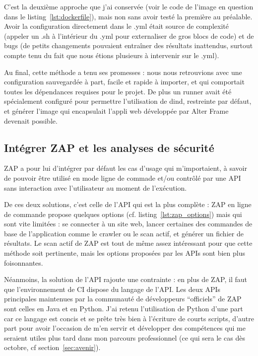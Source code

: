 C'est la deuxième approche que j'ai conservée (voir le code de l'image en question dans le listing~\ref{lst:dockerfile}), mais non sans avoir testé la première au préalable. Avoir la configuration directement dans le .yml était source de complexité (appeler un .sh à l'intérieur du .yml pour externaliser de gros blocs de code) et de bugs (de petits changements pouvaient entraîner des résultats inattendus, surtout compte tenu du fait que nous étions plusieurs à intervenir sur le .yml).

Au final, cette méthode a tenu ses promesses : nous nous retrouvions avec une configuration sauvegardée à part, facile et rapide à importer, et qui comportait toutes les dépendances requises pour le projet. De plus un runner avait été spécialement configuré pour permettre l'utilisation de dind, restreinte par défaut, et générer l'image qui encapsulait l'appli web développée par Alter Frame devenait possible.

\subsection{Intégrer ZAP et les analyses de sécurité}
ZAP a pour lui d'intégrer par défaut les cas d'usage qui m'importaient, à savoir de pouvoir être utilisé en mode ligne de commade et/ou contrôlé par une API sans interaction avec l'utilisateur au moment de l'exécution.

De ces deux solutions, c'est celle de l'API qui est la plus complète : ZAP en ligne de commande propose quelques options (cf. listing~\ref{lst:zap_options}) mais qui sont vite limitées : se connecter à un site web, lancer certaines des commandes de base de l'application comme le crawler ou le scan actif, et générer un fichier de résultats. Le scan actif de ZAP est tout de même assez intéressant pour que cette méthode soit pertinente, mais les options proposées par les APIs sont bien plus foisonnantes.

Néanmoins, la solution de l'API rajoute une contrainte : en plus de ZAP, il faut que l'environnement de CI dispose du langage de l'API. Les deux APIs principales maintenues par la communauté de développeurs ``officiels'' de ZAP sont celles en Java et en Python. J'ai retenu l'utilisation de Python d'une part car ce langage est concis et se prête très bien à l'écriture de courts scripts, d'autre part pour avoir l'occasion de m'en servir et développer des compétences qui me seraient utiles plus tard dans mon parcours professionnel (ce qui sera le cas dès octobre, cf section~\ref{sec:avenir}).

